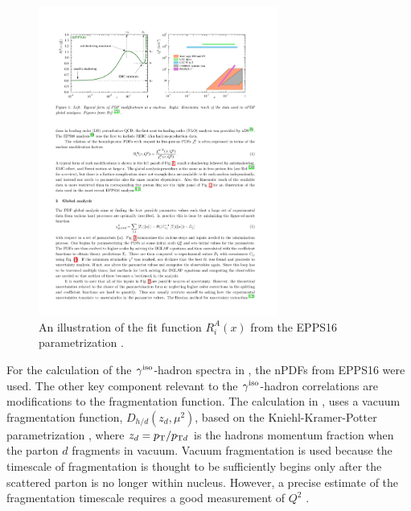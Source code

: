 \begin{figure}[htpb]
  \centering
  \includegraphics[width=0.7\textwidth]{Introduction/cnm_cartoon}
  \caption{An illustration of the fit function $R_{i}^{A}(x)$ from the EPPS16 parametrization \cite{epps16:2017}.}
  \label{fig:cnm_cartoon_2}
\end{figure}

For the calculation of the $\gamma^\mathrm{iso}$-hadron spectra in \cite{Xie2021}, the nPDFs from EPPS16 were used. The other key component relevant to the $\gamma^\mathrm{iso}$-hadron correlations are modifications to the fragmentation function. The calculation in \cite{Xie2021}, uses a vacuum fragmentation function, $D_{h / d}\left(z_{d}, \mu^{2}\right)$, based on the Kniehl-Kramer-Potter parametrization \cite{Kniehl2000}, where $z_d=p_{\mathrm{T}}/p_{\mathrm{T}d}$ is the hadrons momentum fraction when the parton $d$ fragments in vacuum. Vacuum fragmentation is used because the timescale of fragmentation is thought to be sufficiently begins only after the scattered parton is no longer within nucleus. However, a precise estimate of the fragmentation timescale requires a good measurement of $Q^2$ \cite{Sasabe1980}.



